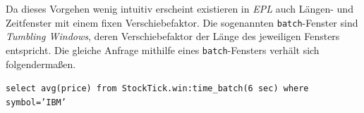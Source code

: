 \documentclass{acm_proc_article-sp}
\begin{document}
\begin{table}[ht]
    \caption{Fenster ohne Verschiebefaktor}
    \label{table:ereignis}\vspace{0.2cm}
\end{table}

Da dieses Vorgehen wenig intuitiv erscheint existieren in \textit{EPL} auch Längen- und 
Zeitfenster mit einem fixen Verschiebefaktor. Die sogenannten \texttt{batch}-Fenster sind 
\textit{Tumbling Windows}, deren Verschiebefaktor der Länge des jeweiligen Fensters 
entspricht. Die gleiche Anfrage mithilfe eines \texttt{batch}-Fensters verhält sich 
folgendermaßen.

\texttt{select  avg(price) from StockTick.win:time\_batch(6 sec) where symbol='IBM'}

\begin{table}[ht]
    \caption{\texttt{batch}-Fenster}
    \label{table:ereignis-batch}\vspace{0.2cm}
\end{table}
\end{document}
